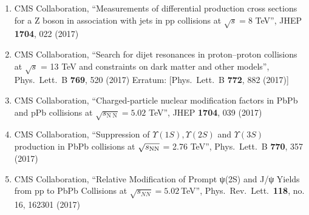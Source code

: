 \begin{enumerate}
\item CMS Collaboration, ``Measurements of differential production cross sections for a Z boson in association with jets in pp collisions at $ \sqrt{s}=8 $ TeV'', JHEP {\bf 1704}, 022 (2017)

\item CMS Collaboration, ``Search for dijet resonances in proton–proton collisions at $\sqrt{s}$ = 13 TeV and constraints on dark matter and other models'', Phys.\ Lett.\ B {\bf 769}, 520 (2017)
  Erratum: [Phys.\ Lett.\ B {\bf 772}, 882 (2017)]

\item CMS Collaboration, ``Charged-particle nuclear modification factors in PbPb and pPb collisions at $ \sqrt{s_{\mathrm{N}\;\mathrm{N}}}=5.02 $ TeV'', JHEP {\bf 1704}, 039 (2017)

\item CMS Collaboration, ``Suppression of $\Upsilon(1S), \Upsilon(2S)$ and $\Upsilon(3S)$ production in PbPb collisions at $\sqrt{s_{\rm NN}}$ = 2.76 TeV'', Phys.\ Lett.\ B {\bf 770}, 357 (2017)

\item CMS Collaboration, ``Relative Modification of Prompt ψ(2S) and J/ψ Yields from pp to PbPb Collisions at $\sqrt{s_{NN}}=5.02$ TeV'', Phys.\ Rev.\ Lett.\  {\bf 118}, no. 16, 162301 (2017)


\end{enumerate}
